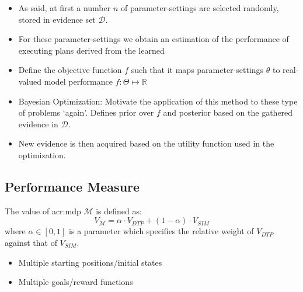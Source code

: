 \begin{itemize}
	\item As said, at first a number $n$ of parameter-settings are selected randomly, stored in evidence set $\mathcal{D}$.
	\item For these parameter-settings we obtain an estimation of the performance of executing plans derived from the learned 
	\item Define the objective function $f$ such that it maps parameter-settings $\theta$ to real-valued model performance $f: \Theta \mapsto \mathbb{R}$ 
	\item Bayesian Optimization: Motivate the application of this method to these type of problems `again'. Defines prior over $f$ and posterior based on the gathered evidence in $\mathcal{D}$.
	\item New evidence is then acquired based on the utility function used in the optimization.
\end{itemize}

\subsection{Performance Measure}
\label{sec:performance-measure}


The value of \acrshort{acr:mdp} $\mathcal{M}$ is defined as:
\begin{equation}
	V_{\mathcal{M}} = \alpha \cdot V_\mathit{DTP} + (1 - \alpha) \cdot V_\mathit{SIM}
\end{equation}
where $\alpha \in [0, 1]$ is a parameter which specifies the relative weight of $V_\mathit{DTP}$ against that of $V_\mathit{SIM}$.

\begin{itemize}
	\item Multiple starting positions/initial states
	\item Multiple goals/reward functions
\end{itemize}

